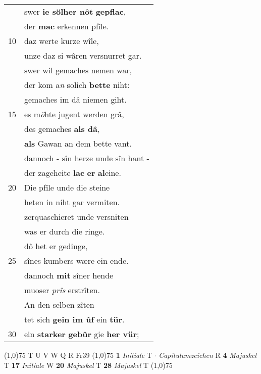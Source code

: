 \documentclass[8pt,a4paper,notitlepage]{article}
\begin{document}
\begin{table}[ht]
\begin{minipage}[t]{0.5\linewidth}
\begin{tabular}{rl}
 & swer \textbf{ie sölher nôt} \textbf{gepflac},\\ 
 & der \textbf{mac} erkennen pfîle.\\ 
10 & daz werte kurze wîle,\\ 
 & unze daz si wâren versnurret gar.\\ 
 & swer wil gemaches nemen war,\\ 
 & der kom a\textit{n} solich \textbf{bette} niht:\\ 
 & gemaches im dâ niemen giht.\\ 
15 & es m\textit{ö}hte jugent werden grâ,\\ 
 & des gemaches \textbf{als dâ},\\ 
 & \textbf{als} Gawan an dem bette vant.\\ 
 & dannoch - sîn herze unde sîn hant -\\ 
 & der zageheite \textbf{lac} \textbf{er} \textbf{al}eine.\\ 
20 & Die pfîle unde die steine\\ 
 & heten in niht gar vermiten.\\ 
 & zerquaschieret unde versniten\\ 
 & was er durch die ringe.\\ 
 & dô het er gedinge,\\ 
25 & sînes kumbers wære ein ende.\\ 
 & dannoch \textbf{mit} sîner hende\\ 
 & muoser \textit{prîs} erstrîten.\\ 
 & An den selben zîten\\ 
 & tet sich \textbf{gein im ûf} ein \textbf{tür}.\\ 
30 & ein \textbf{starker} \textbf{gebûr} gie \textbf{her vür};\\ 
\end{tabular}
\scriptsize
\line(1,0){75} \newline
T U V W Q R Fr39 \newline
\line(1,0){75} \newline
\textbf{1} \textit{Initiale} T   $\cdot$ \textit{Capitulumzeichen} R  \textbf{4} \textit{Majuskel} T  \textbf{17} \textit{Initiale} W  \textbf{20} \textit{Majuskel} T  \textbf{28} \textit{Majuskel} T  \newline
\line(1,0){75} \newline

\end{minipage}
\end{table}
\end{document}
